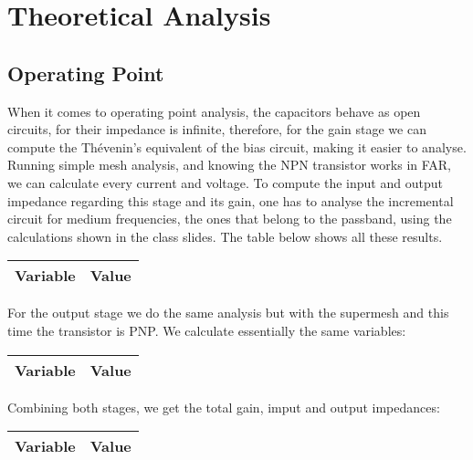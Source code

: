\newpage

\section{Theoretical Analysis}
\label{sec:analysis}

\subsection{Operating Point}

When it comes to operating point analysis, the capacitors behave as open circuits, for their impedance is infinite, therefore, for the gain stage we can compute the Thévenin's equivalent of the bias circuit, making it easier to analyse. Running simple mesh analysis, and knowing the NPN transistor works in FAR, we can calculate every current and voltage.
To compute the input and output impedance regarding this stage and its gain, one has to analyse the incremental circuit for medium frequencies, the ones that belong to the passband, using the calculations shown in the class slides. The table below shows all these results.

\begin{center}
\begin{tabular}{|l|r|}
  \hline    
  {\bf Variable} & {\bf Value} \\ \hline
  
\end{tabular}
\end{center}

For the output stage we do the same analysis but with the supermesh and this time the transistor is PNP. We calculate essentially the same variables:

\begin{center}
\begin{tabular}{|l|r|}
  \hline    
  {\bf Variable} & {\bf Value} \\ \hline
  
\end{tabular}
\end{center}


Combining both stages, we get the total gain, imput and output impedances:

\begin{center}
\begin{tabular}{|l|r|}
  \hline    
  {\bf Variable} & {\bf Value} \\ \hline
  
\end{tabular}
\end{center}

